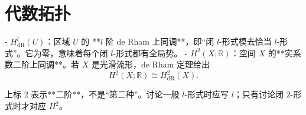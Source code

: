 \chapter{代数拓扑}\label{appx:Alge-Topo}

- \(H^l_{\mathrm{dR}}(U)\)：区域 \(U\) 的 **\(l\) 阶 de Rham 上同调**，即“闭 \(l\)-形式模去恰当 \(l\)-形式”。它为零，意味着每个闭 \(l\)-形式都有全局势。
- \(H^2(X;\mathbb R)\)：空间 \(X\) 的**实系数二阶上同调**。若 \(X\) 是光滑流形，de Rham 定理给出
  \[
  H^2(X;\mathbb R)\cong H^2_{\mathrm{dR}}(X).
  \]

上标 \(2\) 表示**二阶**，不是“第二种”。讨论一般 \(l\)-形式时应写 \(l\)；只有讨论闭 \(2\)-形式时才对应 \(H^2\)。